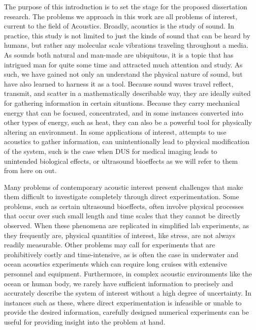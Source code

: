 The purpose of this introduction is to set the stage for the proposed
dissertation research. The problems we approach in this work are all
problems of interest, current to the field of Acoustics. Broadly,
acoustics is the study of sound. In practice, this study is not
limited to just the kinds of sound that can be heard by humans, but
rather any molecular scale vibrations traveling throughout a media. As
sounds both natural and man-made are ubiquitous, it is a topic that
has intrigued man for quite some time and attracted much attention and
study. As such, we have gained not only an understand the physical
nature of sound, but have also learned to harness it as a
tool. Because sound waves travel reflect, transmit, and scatter in a
mathematically describable way, they are ideally suited for gathering
information in certain situations. Because they carry mechanical
energy that can be focused, concentrated, and in some instances
converted into other types of energy, such as heat, they can also be a
powerful tool for physically altering an environment. In some
applications of interest, attempts to use acoustics to gather
information, can unintentionally lead to physical modification of the
system, such is the case when \ac{DUS} for medical imaging leads to
unintended biological effects, or ultrasound bioeffects as we will
refer to them from here on out.

Many problems of contemporary acoustic interest present challenges
that make them difficult to investigate completely through direct
experimentation. Some problems, such as certain ultrasound bioeffects,
often involve physical processes that occur over such small length and
time scales that they cannot be directly observed. When these
phenomena are replicated in simplified lab experiments, as they
frequently are, physical quantities of interest, like stress, are not
always readily measurable. Other problems may call for experiments
that are prohibitively costly and time-intensive, as is often the case
in underwater and ocean acoustics experiments which can require long
cruises with extensive personnel and equipment. Furthermore, in
complex acoustic environments like the ocean or human body, we rarely
have sufficient information to precisely and accurately describe the
system of interest without a high degree of uncertainty. In instances
such as these, where direct experimentation is infeasible or unable to
provide the desired information, carefully designed numerical
experiments can be useful for providing insight into the
problem at hand. 

